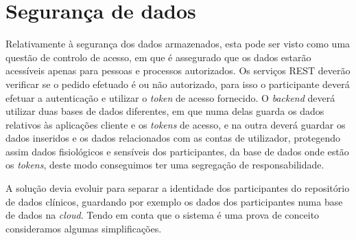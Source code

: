 \section{Segurança de dados}
\label{cap6:protecaodados}
Relativamente à segurança dos dados armazenados, esta pode ser visto como uma questão de controlo de acesso, em que é assegurado que os dados estarão acessíveis apenas para pessoas e processos autorizados. Os serviços \gls{REST} deverão verificar se o pedido efetuado é ou não autorizado, para isso o participante deverá efetuar a autenticação e utilizar o \textit{token} de acesso fornecido. O \textit{backend} deverá utilizar duas bases de dados diferentes, em que numa delas guarda os dados relativos às aplicações cliente e os \textit{tokens} de acesso, e na outra deverá guardar os dados inseridos e os dados relacionados com as contas de utilizador, protegendo assim dados fisiológicos e sensíveis dos participantes, da base de dados onde estão os \textit{tokens}, deste modo conseguimos ter uma segregação de responsabilidade. \par
A solução devia evoluir para separar a identidade dos participantes do repositório de dados clínicos, guardando por exemplo os dados dos participantes numa base de dados na \textit{cloud}. Tendo em conta que o sistema é uma prova de conceito consideramos algumas simplificações.

\cleardoublepage